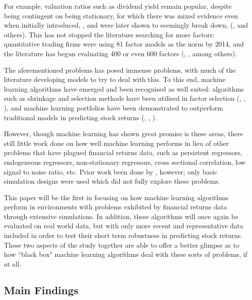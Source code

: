 \documentclass[a4paper]{article}
\begin{document}
For example, valuation ratios such as dividend yield remain popular, despite being contingent on being stationary, for which there was mixed evidence even when initially introduced, \citep{vuolteenaho_understanding_1999}, and were later shown to seemingly break down, (\cite{lettau_consumption_2001}, \cite{schwert_anomalies_2003} and others). This has not stopped the literature searching for more factors: quantitative trading firms were using 81 factor models as the norm \citep{hsu_finding_2014} by 2014, and the literature has begun evaluating 400 or even 600 factors (\cite{harvey__2016}, \cite{harvey_census_2019}, among others).

The aforementioned problems has posed immense problems, with much of the literature developing models to try to deal with this. To this end, machine learning algorithms have emerged and been recognised as well suited: algorithms such as shrinkage and selection methods have been utilised in factor selection (\cite{kozak_shrinking_2017}, \cite{rapach_forecasting_2013}, \cite{freyberger_dissecting_2017}), and machine learning portfolios have been demonstrated to outperform traditional models in predicting stock returns (\cite{gu_empirical_2018}, \cite{hsu_finding_2014}, \cite{feng_deep_2018}). 

However, though machine learning has shown great promise is these areas, there still little work done on how well machine learning performs in lieu of other problems that have plagued financial returns data, such as persistent regressors, endogeneous regressors, non-stationary regressors, cross sectional correlation, low signal to noise ratio, etc. Prior work been done by \cite{gu_empirical_2018}, however; only basic simulation designs were used which did not fully explore these problems.

This paper will be the first in focusing on how machine learning algorithms perform in environments with problems exhibited by financial returns data through extensive simulations. In addition, these algorithms will once again be evaluated on real world data, but with only more recent and representative data included in order to test their short term robustness in predicting stock returns. These two aspects of the study together are able to offer a better glimpse as to how ``black box" machine learning algorithms deal with these sorts of problems, if at all.

\subsection{Main Findings}
\end{document}
